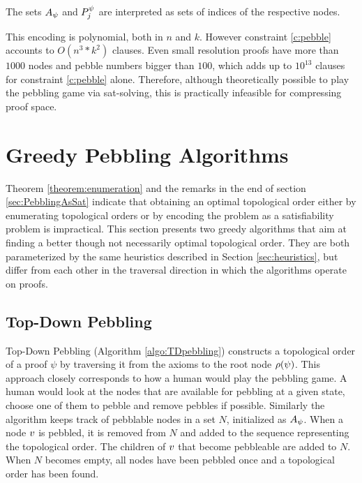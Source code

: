 \documentclass{llncs}
\begin{document}
The sets $A_{\psi}$ and $P_{j}^{\psi}$ are interpreted as sets of indices of the respective nodes.

\noindent
This encoding is polynomial, both in $n$ and $k$. However constraint \ref{c:pebble} accounts to $O(n^3*k^2)$ clauses. Even small resolution proofs have more than $1000$ nodes and pebble numbers bigger than $100$, which adds up to $10^{13}$ clauses for constraint \ref{c:pebble} alone. Therefore, although theoretically possible to play the pebbling game via sat-solving, this is practically infeasible for compressing proof space.


\section{Greedy Pebbling Algorithms}
\label{sec:algorithms}

Theorem \ref{theorem:enumeration} and the remarks in the end of section \ref{sec:PebblingAsSat} indicate that obtaining an optimal topological order either by enumerating topological orders or by encoding the problem as a satisfiability problem is impractical. This section presents two greedy algorithms that aim at finding a better though not necessarily optimal topological order. They are both parameterized by the same heuristics described in Section \ref{sec:heuristics}, but differ from each other in the traversal direction in which the algorithms operate on proofs.

\subsection{Top-Down Pebbling}

Top-Down Pebbling (Algorithm \ref{algo:TDpebbling}) constructs a topological order of a proof $\psi$ by traversing it from the axioms to the root node $\rho(\psi)$.
This approach closely corresponds to how a human would play the pebbling game. 
A human would look at the nodes that are available for pebbling at a given state, choose one of them to pebble and remove pebbles if possible.
Similarly the algorithm keeps track of pebblable nodes in a set $N$, initialized as $A_{\psi}$.
When a node $v$ is pebbled, it is removed from $N$ and added to the sequence representing the topological order. The children of $v$ that become pebbleable are added to $N$.
When $N$ becomes empty, all nodes have been pebbled once and a topological order has been found.
\end{document}
